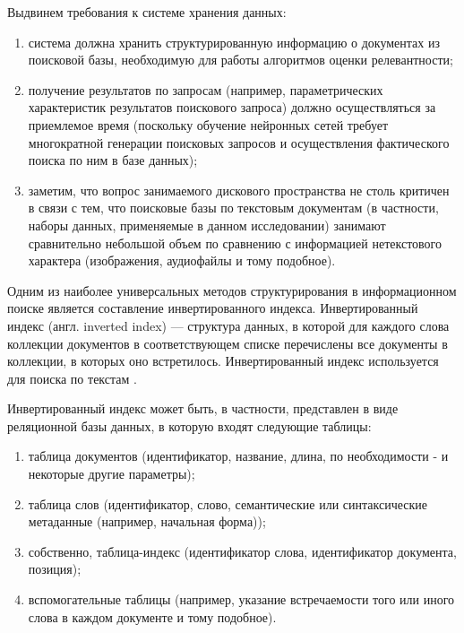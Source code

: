 Выдвинем требования к системе хранения данных:
\begin{enumerate}[1)]
    \item система должна хранить структурированную информацию о документах из поисковой базы, необходимую для работы алгоритмов оценки релевантности;
    \item получение результатов по запросам (например, параметрических характеристик результатов поискового запроса) должно осуществляться за 
          приемлемое время (поскольку обучение нейронных сетей требует многократной генерации поисковых запросов и осуществления фактического поиска
          по ним в базе данных);
    \item заметим, что вопрос занимаемого дискового пространства не столь критичен в связи с тем, что поисковые базы по текстовым документам
          (в частности, наборы данных, применяемые в данном исследовании) занимают сравнительно небольшой объем по сравнению с информацией
          нетекстового характера (изображения, аудиофайлы и тому подобное).
\end{enumerate}

Одним из наиболее универсальных методов структурирования в информационном поиске является составление инвертированного индекса.
Инвертированный индекс (англ. inverted index) --- структура данных, в которой для каждого слова коллекции документов в соответствующем списке 
перечислены все документы в коллекции, в которых оно встретилось. Инвертированный индекс используется для поиска по текстам 
\cite{baezayates99, 10.1145/296854.277632}. 

Инвертированный индекс может быть, в частности, представлен в виде реляционной базы данных, в которую входят следующие таблицы:
\begin{enumerate}[1)]
    \item таблица документов (идентификатор, название, длина, по необходимости - и некоторые другие параметры);
    \item таблица слов (идентификатор, слово, семантические или синтаксические метаданные (например, начальная форма));
    \item собственно, таблица-индекс (идентификатор слова, идентификатор документа, позиция);
    \item вспомогательные таблицы (например, указание встречаемости того или иного слова в каждом документе и тому подобное).
\end{enumerate}


